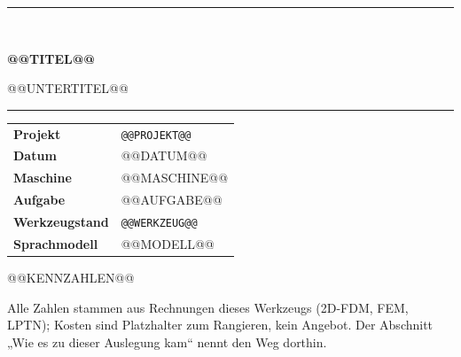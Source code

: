 \begin{titlepage}
\thispagestyle{empty}
\vspace*{2.2cm}
{\color{cae-blau}\rule{\linewidth}{1.6pt}}\\[1.2em]
{\fontsize{26}{30}\selectfont\bfseries\color{cae-blau} @@TITEL@@\par}
\vspace{0.4em}
{\Large\color{cae-grau} @@UNTERTITEL@@\par}
\vspace{0.6em}
{\color{cae-blau}\rule{\linewidth}{0.6pt}}

\vspace{2.0em}
\begin{kennbox}
\begin{tabular}{@{}p{3.6cm}p{11cm}@{}}
\textbf{Projekt}      & \texttt{@@PROJEKT@@}\\
\textbf{Datum}        & @@DATUM@@\\
\textbf{Maschine}     & @@MASCHINE@@\\
\textbf{Aufgabe}      & @@AUFGABE@@\\
\textbf{Werkzeugstand}& \texttt{@@WERKZEUG@@}\\
\textbf{Sprachmodell} & @@MODELL@@\\
\end{tabular}
\end{kennbox}

@@KENNZAHLEN@@

\vfill
{\small\color{cae-grau}
Alle Zahlen stammen aus Rechnungen dieses Werkzeugs (2D-FDM, FEM, LPTN); Kosten sind Platzhalter
zum Rangieren, kein Angebot. Der Abschnitt „Wie es zu dieser Auslegung kam“ nennt den Weg dorthin.}
\end{titlepage}
\tableofcontents
\newpage
